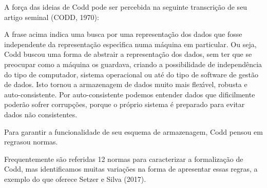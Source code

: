 \documentclass[
12pt,		%
openright,	%
twoside,  %
a4paper,			%
chapter=TITLE,		%
english,			%
french,				%
spanish,			%
brazil				%
]{USPSC-classe/USPSC}
\begin{document}
A for\c{c}a das ideias de Codd pode ser percebida na seguinte transcri\c{c}\~ao de seu artigo seminal (CODD, 1970):











\noindent\begin{center}\mbox{\centering{}}\end{center}


A frase acima indica uma busca por uma representa\c{c}\~ao dos dados que fosse independente da representa\c{c}\~ao espec\'{\i}fica numa m\'aquina em particular. Ou seja, Codd buscou uma forma de abstrair a representa\c{c}\~ao dos dados, sem ter que se preocupar como a m\'aquina os guardava, criando a possibilidade de independ\^encia do tipo de computador, sistema operacional ou at\'e do tipo de software de gest\~ao de dados. Isto tornou a armazenagem de dados muito mais flex\'{\i}vel, robusta e auto-consistente. Por auto-consistente podemos entender dados que dificilmente poder\~ao sofrer corrup\c{c}\~oes, porque o pr\'oprio sistema \'e preparado para evitar dados n\~ao consistentes.










Para garantir a funcionalidade de seu esquema de armazenagem, Codd pensou em \textquotedbl regras\textquotedbl  ou normas.










Frequentemente s\~ao referidas 12 normas para caracterizar a formaliza\c{c}\~ao de Codd, mas identificamos muitas varia\c{c}\~oes na forma de apresentar essas regras, a exemplo do que oferece Setzer e Silva (2017).
\end{document}
